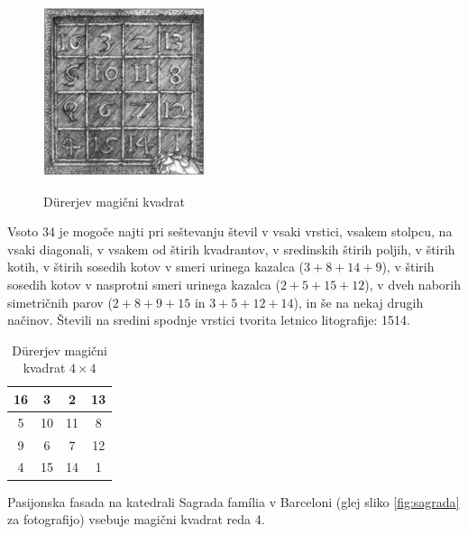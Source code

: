 \documentclass[a4paper,12pt]{article}
\newenvironment{magic}[3]
   {\begin{table}[h]
      \caption{#2}
      \label{#3}
      \large
      \centering
      \begin{tabular}{|*{#1}{c|}}
         \hline
   }
      {
      \end{tabular}
      \end{table}
      }
\begin{document}

\begin{figure}[!ht]
   \centering
   \caption{Dürerjev magični kvadrat}
   \includegraphics[scale=1.5]{durer.png}
   \label{fig:durer}
\end{figure}

Vsoto 34 je mogoče najti pri seštevanju števil v vsaki vrstici, vsakem stolpcu,
na vsaki diagonali, v vsakem od štirih kvadrantov, v sredinskih štirih poljih,
v štirih kotih, v štirih sosedih kotov v smeri urinega kazalca ($3+8+14+9$), v
štirih sosedih kotov v nasprotni smeri urinega kazalca ($2+5+15+12$), v dveh naborih
simetričnih parov ($2+8+9+15$ in $3+5+12+14$), in še na nekaj drugih načinov.
Števili na sredini spodnje vrstici tvorita letnico litografije: 1514.
%
\begin{magic}{4}{Dürerjev magični kvadrat $4\times 4$}{table:durer}
   16 &  3 &  2 & 13 \\\hline
   5 & 10 & 11 &  8 \\\hline
   9 &  6 &  7 & 12 \\\hline
   4 & 15 & 14 & 1 \\\hline
\end{magic}

Pasijonska fasada na katedrali Sagrada família v Barceloni
(glej sliko \ref{fig:sagrada} za fotografijo) vsebuje magični kvadrat reda 4.

\end{document}
